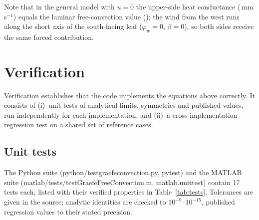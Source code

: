 \documentclass[11pt,a4paper]{article}
\newcommand{\codeus}{\char95\allowbreak}
\DeclareRobustCommand{\code}[1]{\textnormal{\ttfamily\let\_\codeus #1}}
\begin{document}
\noindent Note that in the general model with $u=0$ the upper-side heat conductance (\ExgbStillU\,mm\,s$^{-1}$) equals the laminar free-convection value (\ExgbU); the wind from the west runs along the short axis of the south-facing leaf ($\varphi_w = 0$, $\beta = 0$), so both sides receive the same forced contribution.

\section{Verification}\label{sec:verification}
Verification establishes that the code implements the equations above correctly. It consists of (i)~unit tests of analytical limits, symmetries and published values, run independently for each implementation, and (ii)~a cross-implementation regression test on a shared set of reference cases.

\subsection{Unit tests}
The Python suite (\code{python/test\_graefe\_convection.py}, pytest) and the MATLAB suite (\code{matlab/tests/testGraefeFreeConvection.m}, \code{matlab.unittest}) contain 17 tests each, listed with their verified properties in Table~\ref{tab:tests}. Tolerances are given in the source; analytic identities are checked to $10^{-9}$--$10^{-15}$, published regression values to their stated precision.
\end{document}
